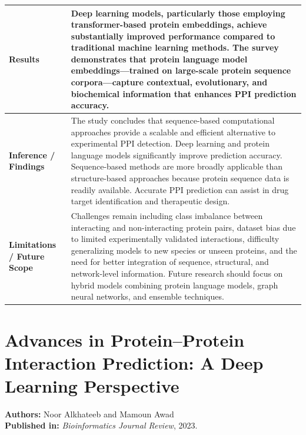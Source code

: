 \documentclass[12pt,a4paper]{report}
\begin{document}
\begin{table}[H]
\centering
\renewcommand{\arraystretch}{1.5}
\begin{tabular}{|p{}|p{}|}
\hline
\textbf{Results} & Deep learning models, particularly those employing transformer-based protein embeddings, achieve substantially improved performance compared to traditional machine learning methods. The survey demonstrates that protein language model embeddings---trained on large-scale protein sequence corpora---capture contextual, evolutionary, and biochemical information that enhances PPI prediction accuracy. \\ \hline
\textbf{Inference / Findings} & The study concludes that sequence-based computational approaches provide a scalable and efficient alternative to experimental PPI detection. Deep learning and protein language models significantly improve prediction accuracy. Sequence-based methods are more broadly applicable than structure-based approaches because protein sequence data is readily available. Accurate PPI prediction can assist in drug target identification and therapeutic design. \\ \hline
\textbf{Limitations / Future Scope} & Challenges remain including class imbalance between interacting and non-interacting protein pairs, dataset bias due to limited experimentally validated interactions, difficulty generalizing models to new species or unseen proteins, and the need for better integration of sequence, structural, and network-level information. Future research should focus on hybrid models combining protein language models, graph neural networks, and ensemble techniques. \\ \hline
\end{tabular}
\end{table}

\newpage

\section{Advances in Protein–Protein Interaction Prediction: A Deep Learning Perspective}
\textbf{Authors:} Noor Alkhateeb and Mamoun Awad \\
\textbf{Published in:} \textit{Bioinformatics Journal Review}, 2023.
\end{document}

